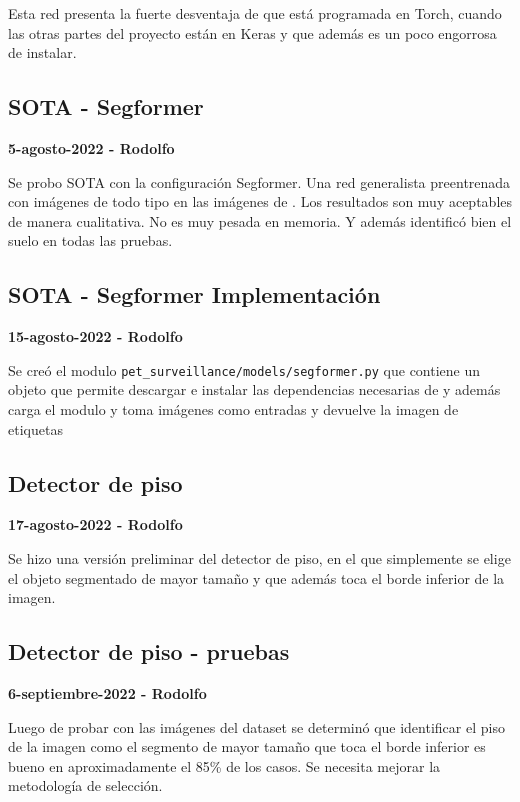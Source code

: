Esta red presenta la fuerte desventaja de que está programada en Torch, cuando las otras partes del proyecto están en Keras y que además es un poco engorrosa de instalar.


\subsection*{SOTA - Segformer}

\textbf{5-agosto-2022 - Rodolfo}

Se probo SOTA con la configuración Segformer. Una red generalista preentrenada con imágenes de todo tipo en las imágenes de \textcite{unity2022}. Los resultados son muy aceptables de manera cualitativa. No es muy pesada en memoria. Y además identificó bien el suelo en todas las pruebas.



\subsection*{SOTA - Segformer Implementación}

\textbf{15-agosto-2022 - Rodolfo}

Se creó el modulo \texttt{pet\_surveillance/models/segformer.py} que contiene un objeto que permite descargar e instalar las dependencias necesarias de \textcite{aung2022} y además carga el modulo y toma imágenes como entradas y devuelve la imagen de etiquetas


\subsection*{Detector de piso}

\textbf{17-agosto-2022 - Rodolfo}

Se hizo una versión preliminar del detector de piso, en el que simplemente se elige el objeto segmentado de mayor tamaño y que además toca el borde inferior de la imagen.


\subsection*{Detector de piso - pruebas}

\textbf{6-septiembre-2022 - Rodolfo}

Luego de probar con las imágenes del dataset se determinó que identificar el piso de la imagen como el segmento de mayor tamaño que toca el borde inferior es bueno en aproximadamente el 85\% de los casos. Se necesita mejorar la metodología de selección.

